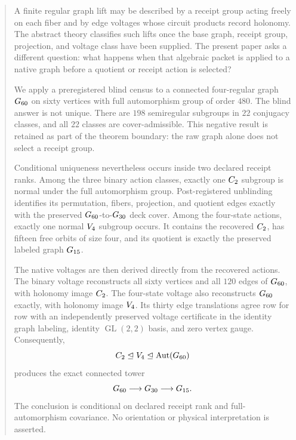\begin{abstract}
A finite regular graph lift may be described by a receipt group acting
freely on each fiber and by edge voltages whose circuit products record
holonomy.  The abstract theory classifies such lifts once the base
graph, receipt group, projection, and voltage class have been supplied.
The present paper asks a different question: what happens when that
algebraic packet is applied to a native graph before a quotient or
receipt action is selected?

We apply a preregistered blind census to a connected four-regular graph
\(\Gsixty\) on sixty vertices with full automorphism group of order
\(480\).  The blind answer is not unique.  There are \(198\)
semiregular subgroups in \(22\) conjugacy classes, and all \(22\)
classes are cover-admissible.  This negative result is retained as part
of the theorem boundary: the raw graph alone does not select a receipt
group.

Conditional uniqueness nevertheless occurs inside two declared receipt
ranks.  Among the three binary action classes, exactly one \(\Ctwo\)
subgroup is normal under the full automorphism group.  Post-registered
unblinding identifies its permutation, fibers, projection, and quotient
edges exactly with the preserved \(\Gsixty\)-to-\(\Gthirty\) deck
cover.  Among the four-state actions, exactly one normal \(\Vfour\)
subgroup occurs.  It contains the recovered \(\Ctwo\), has fifteen free
orbits of size four, and its quotient is exactly the preserved labeled
graph \(\Gfifteen\).

The native voltages are then derived directly from the recovered
actions.  The binary voltage reconstructs all sixty vertices and all
\(120\) edges of \(\Gsixty\), with holonomy image \(\Ctwo\).  The
four-state voltage also reconstructs \(\Gsixty\) exactly, with holonomy
image \(\Vfour\).  Its thirty edge translations agree row for row with
an independently preserved voltage certificate in the identity graph
labeling, identity \(\operatorname{GL}(2,2)\) basis, and zero vertex
gauge.  Consequently,
\[
  \Ctwo \trianglelefteq \Vfour
  \trianglelefteq \Aut(\Gsixty)
\]
produces the exact connected tower
\[
  \Gsixty \longrightarrow \Gthirty \longrightarrow \Gfifteen.
\]
The conclusion is conditional on declared receipt rank and
full-automorphism covariance.  No orientation or physical
interpretation is asserted.
\end{abstract}
